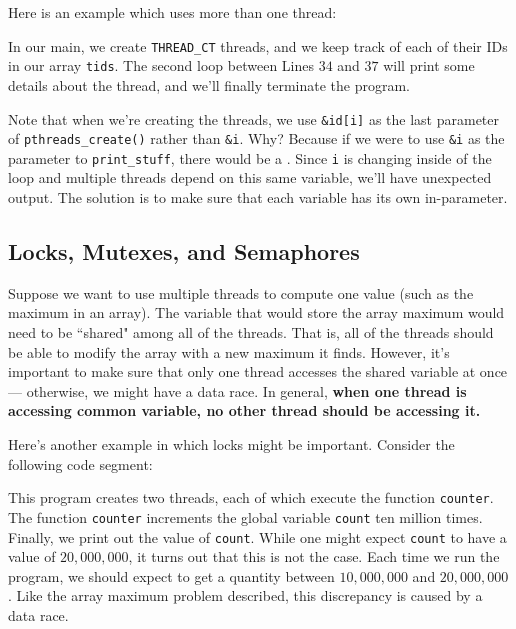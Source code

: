 Here is an example which uses more than one thread:

\lstset{caption=Multiple Threads}
\begin{center}

\end{center}

In our main, we create \verb!THREAD_CT! threads, and we keep track of each of their IDs in our array \verb!tids!. The second loop between Lines $34$ and $37$ will print some details about the thread, and we'll finally terminate the program. 

Note that when we're creating the threads, we use \verb!&id[i]! as the last parameter of \verb!pthreads_create()! rather than \verb!&i!. Why? Because if we were to use \verb!&i! as the parameter to \verb!print_stuff!, there would be a . Since \verb!i! is changing inside of the loop and multiple threads depend on this same variable, we'll have unexpected output. The solution is to make sure that each variable has its own in-parameter. \\[1em]


\subsection{Locks, Mutexes, and Semaphores}

Suppose we want to use multiple threads to compute one value (such as the maximum in an array). The variable that would store the array maximum would need to be ``shared" among all of the threads. That is, all of the threads should be able to modify the array with a new maximum it finds. However, it's important to make sure that only one thread accesses the shared variable at once --- otherwise, we might have a data race. In general, \textbf{when one thread is accessing common variable, no other thread should be accessing it.}


Here's another example in which locks might be important. Consider the following code segment:



\lstset{caption=Accessing Critical Section without Synchronization}
\begin{center}

\end{center}

This program creates two threads, each of which execute the function \verb!counter!. The function \verb!counter! increments the global variable \verb!count! ten million times. Finally, we print out the value of \verb!count!. While one might expect \verb!count! to have a value of $20,000,000$, it turns out that this is not the case. Each time we run the program, we should expect to get a quantity between $10,000,000$ and $20,000,000$. Like the array maximum problem described, this discrepancy is caused by a data race.


